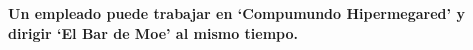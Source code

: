 \textbf{Un empleado puede trabajar en ‘Compumundo Hipermegared’ y dirigir ‘El Bar de Moe’ al mismo tiempo.}\vspace{.3cm}
